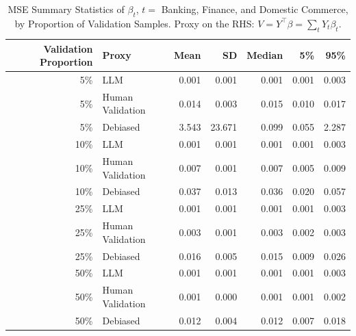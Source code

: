 \begin{table}

\caption{\label{tab:unnamed-chunk-1}MSE Summary Statistics of $\beta_{t}$, $t=$ Banking, Finance, and Domestic Commerce, by Proportion of Validation Samples.
      Proxy on the RHS: $V = Y^\top \beta = \sum_{t} Y_t \beta_t$.}
\centering
\begin{tabular}[t]{rlrrrrr}
\toprule
Validation Proportion & Proxy & Mean & SD & Median & 5\% & 95\%\\
\midrule
5\% & LLM & 0.001 & 0.001 & 0.001 & 0.001 & 0.003\\
5\% & Human Validation & 0.014 & 0.003 & 0.015 & 0.010 & 0.017\\
5\% & Debiased & 3.543 & 23.671 & 0.099 & 0.055 & 2.287\\
10\% & LLM & 0.001 & 0.001 & 0.001 & 0.001 & 0.003\\
10\% & Human Validation & 0.007 & 0.001 & 0.007 & 0.005 & 0.009\\
10\% & Debiased & 0.037 & 0.013 & 0.036 & 0.020 & 0.057\\
25\% & LLM & 0.001 & 0.001 & 0.001 & 0.001 & 0.003\\
25\% & Human Validation & 0.003 & 0.001 & 0.003 & 0.002 & 0.003\\
25\% & Debiased & 0.016 & 0.005 & 0.015 & 0.009 & 0.026\\
50\% & LLM & 0.001 & 0.001 & 0.001 & 0.001 & 0.003\\
50\% & Human Validation & 0.001 & 0.000 & 0.001 & 0.001 & 0.002\\
50\% & Debiased & 0.012 & 0.004 & 0.012 & 0.007 & 0.018\\
\bottomrule
\end{tabular}
\end{table}

